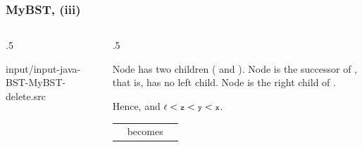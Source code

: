 \documentclass[10pt]{beamer}
\begin{document}
\begin{frame}[t]\frametitle{MyBST,  (iii)}
	\vspace{-0.3cm}
	\begin{columns}[T] %
	\begin{column}{.5\linewidth} %
		{\tiny 
			
				{input/input-java-BST-MyBST-delete.src}
		} %
\	\end{column} %
	\begin{column}{.5\linewidth} %
		{\tiny 
		\begin{example}
		Node  has two children (\hCode{$\ell$} and ).
		Node  is the successor of , 
		that is,  has no left child.
		Node  is the right child of  .
		
		Hence,
		and $\hCode{$\ell$} <  \hCode{z} <  \hCode{y} <  \hCode{x}$.
		\begin{center}
			\begin{tabular}{c c c}
				\adjustbox{valign=t}{			
					
				} %
				& becomes
				&
				\adjustbox{valign=t}{	
					
				} %
			\end{tabular}
		\end{center}
		\end{example}
		} %
	\end{column} %
	\end{columns} %

\end{frame}
\end{document}
